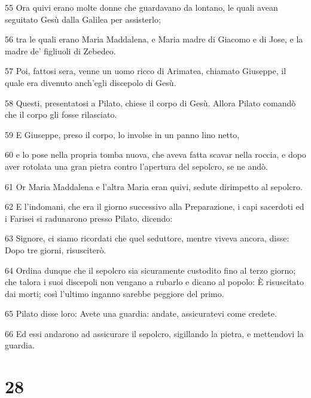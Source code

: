 \par 55 Ora quivi erano molte donne che guardavano da lontano, le quali avean seguitato Gesù dalla Galilea per assisterlo;
\par 56 tra le quali erano Maria Maddalena, e Maria madre di Giacomo e di Jose, e la madre de' figliuoli di Zebedeo.
\par 57 Poi, fattosi sera, venne un uomo ricco di Arimatea, chiamato Giuseppe, il quale era divenuto anch'egli discepolo di Gesù.
\par 58 Questi, presentatosi a Pilato, chiese il corpo di Gesù. Allora Pilato comandò che il corpo gli fosse rilasciato.
\par 59 E Giuseppe, preso il corpo, lo involse in un panno lino netto,
\par 60 e lo pose nella propria tomba nuova, che aveva fatta scavar nella roccia, e dopo aver rotolata una gran pietra contro l'apertura del sepolcro, se ne andò.
\par 61 Or Maria Maddalena e l'altra Maria eran quivi, sedute dirimpetto al sepolcro.
\par 62 E l'indomani, che era il giorno successivo alla Preparazione, i capi sacerdoti ed i Farisei si radunarono presso Pilato, dicendo:
\par 63 Signore, ci siamo ricordati che quel seduttore, mentre viveva ancora, disse: Dopo tre giorni, risusciterò.
\par 64 Ordina dunque che il sepolcro sia sicuramente custodito fino al terzo giorno; che talora i suoi discepoli non vengano a rubarlo e dicano al popolo: È risuscitato dai morti; così l'ultimo inganno sarebbe peggiore del primo.
\par 65 Pilato disse loro: Avete una guardia: andate, assicuratevi come credete.
\par 66 Ed essi andarono ad assicurare il sepolcro, sigillando la pietra, e mettendovi la guardia.

\chapter{28}

